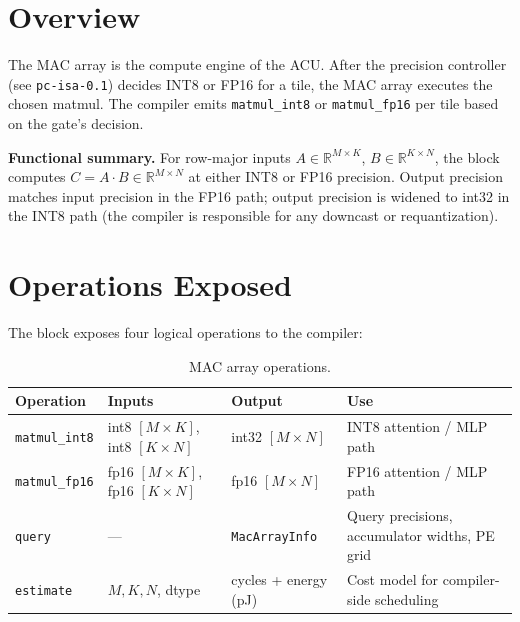 \documentclass[11pt]{article}
\begin{document}
\section{Overview}
\label{sec:overview}

The MAC array is the compute engine of the ACU. After the precision
controller (see \texttt{pc-isa-0.1}) decides INT8 or FP16 for a tile,
the MAC array executes the chosen matmul. The compiler emits
\texttt{matmul\_int8} or \texttt{matmul\_fp16} per tile based on the
gate's decision.

\medskip
\noindent\textbf{Functional summary.} For row-major inputs
$A \in \mathbb{R}^{M \times K}$, $B \in \mathbb{R}^{K \times N}$, the
block computes $C = A \cdot B \in \mathbb{R}^{M \times N}$ at either
INT8 or FP16 precision. Output precision matches input precision in
the FP16 path; output precision is widened to int32 in the INT8 path
(the compiler is responsible for any downcast or requantization).

\section{Operations Exposed}
\label{sec:ops}

The block exposes four logical operations to the compiler:

\begin{table}[ht]
\centering
\small
\caption{MAC array operations.}
\label{tab:ops}
\begin{tabular}{@{}l p{3.4cm} l p{5cm}@{}}
\toprule
Operation                & Inputs                & Output                & Use \\
\midrule
\texttt{matmul\_int8}    & int8 $[M \!\times\! K]$, int8 $[K \!\times\! N]$ & int32 $[M \!\times\! N]$ & INT8 attention / MLP path \\
\texttt{matmul\_fp16}    & fp16 $[M \!\times\! K]$, fp16 $[K \!\times\! N]$ & fp16 $[M \!\times\! N]$ & FP16 attention / MLP path \\
\texttt{query}           & ---                   & \texttt{MacArrayInfo} & Query precisions, accumulator widths, PE grid \\
\texttt{estimate}        & $M, K, N$, dtype      & cycles + energy (pJ)  & Cost model for compiler-side scheduling \\
\bottomrule
\end{tabular}
\end{table}
\end{document}
